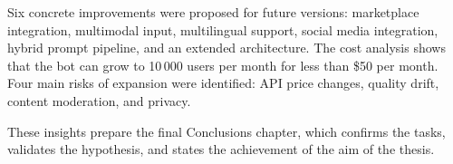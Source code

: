 Six concrete improvements were proposed for future versions: marketplace integration, multimodal input, multilingual support, social media integration, hybrid prompt pipeline, and an extended architecture. The cost analysis shows that the bot can grow to 10\,000 users per month for less than \$50 per month. Four main risks of expansion were identified: API price changes, quality drift, content moderation, and privacy.

These insights prepare the final Conclusions chapter, which confirms the tasks, validates the hypothesis, and states the achievement of the aim of the thesis.
